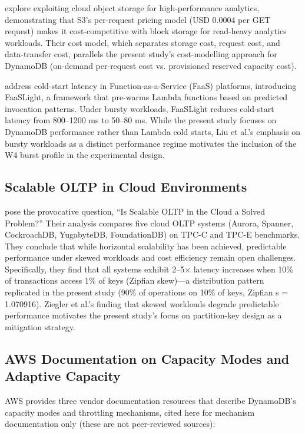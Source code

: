 \citet{durner2023object} explore exploiting cloud object storage for high-performance analytics, demonstrating that S3's per-request pricing model (USD 0.0004 per GET request) makes it cost-competitive with block storage for read-heavy analytics workloads. Their cost model, which separates storage cost, request cost, and data-transfer cost, parallels the present study's cost-modelling approach for DynamoDB (on-demand per-request cost vs. provisioned reserved capacity cost).

\citet{liu2023faaslight} address cold-start latency in Function-as-a-Service (FaaS) platforms, introducing FaaSLight, a framework that pre-warms Lambda functions based on predicted invocation patterns. Under bursty workloads, FaaSLight reduces cold-start latency from 800–1200 ms to 50–80 ms. While the present study focuses on DynamoDB performance rather than Lambda cold starts, Liu et al.'s emphasis on bursty workloads as a distinct performance regime motivates the inclusion of the W4 burst profile in the experimental design.

\subsection{Scalable OLTP in Cloud Environments}

\citet{ziegler2023oltp} pose the provocative question, ``Is Scalable OLTP in the Cloud a Solved Problem?'' Their analysis compares five cloud OLTP systems (Aurora, Spanner, CockroachDB, YugabyteDB, FoundationDB) on TPC-C and TPC-E benchmarks. They conclude that while horizontal scalability has been achieved, predictable performance under skewed workloads and cost efficiency remain open challenges. Specifically, they find that all systems exhibit 2–5× latency increases when 10\% of transactions access 1\% of keys (Zipfian skew)—a distribution pattern replicated in the present study (90\% of operations on 10\% of keys, Zipfian s = 1.070916). Ziegler et al.'s finding that skewed workloads degrade predictable performance motivates the present study's focus on partition-key design as a mitigation strategy.

\subsection{AWS Documentation on Capacity Modes and Adaptive Capacity}

AWS provides three vendor documentation resources that describe DynamoDB's capacity modes and throttling mechanisms, cited here for mechanism documentation only (these are not peer-reviewed sources):

